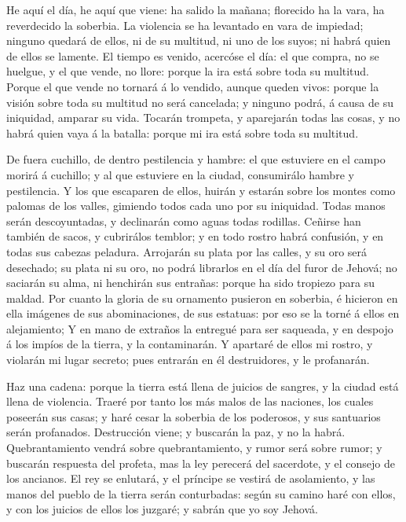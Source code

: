 He aquí el día, he aquí que viene: ha salido la mañana;
florecido ha la vara, ha reverdecido la soberbia.  La
violencia se ha levantado en vara de impiedad; ninguno quedará de ellos,
ni de su multitud, ni uno de los suyos; ni habrá quien de ellos se
lamente.  El tiempo es venido, acercóse el día: el que
compra, no se huelgue, y el que vende, no llore: porque la ira está
sobre toda su multitud.  Porque el que vende no tornará á
lo vendido, aunque queden vivos: porque la visión sobre toda su multitud
no será cancelada; y ninguno podrá, á causa de su iniquidad, amparar su
vida.  Tocarán trompeta, y aparejarán todas las cosas, y
no habrá quien vaya á la batalla: porque mi ira está sobre toda su
multitud.

 De fuera cuchillo, de dentro pestilencia y hambre: el
que estuviere en el campo morirá á cuchillo; y al que estuviere en la
ciudad, consumirálo hambre y pestilencia.  Y los que
escaparen de ellos, huirán y estarán sobre los montes como palomas de
los valles, gimiendo todos cada uno por su iniquidad. 
Todas manos serán descoyuntadas, y declinarán como aguas todas rodillas.
 Ceñirse han también de sacos, y cubrirálos temblor; y en
todo rostro habrá confusión, y en todas sus cabezas peladura.
 Arrojarán su plata por las calles, y su oro será
desechado; su plata ni su oro, no podrá librarlos en el día del furor de
Jehová; no saciarán su alma, ni henchirán sus entrañas: porque ha sido
tropiezo para su maldad.  Por cuanto la gloria de su
ornamento pusieron en soberbia, é hicieron en ella imágenes de sus
abominaciones, de sus estatuas: por eso se la torné á ellos en
alejamiento;  Y en mano de extraños la entregué para ser
saqueada, y en despojo á los impíos de la tierra, y la contaminarán.
 Y apartaré de ellos mi rostro, y violarán mi lugar
secreto; pues entrarán en él destruidores, y le profanarán.

 Haz una cadena: porque la tierra está llena de juicios
de sangres, y la ciudad está llena de violencia.  Traeré
por tanto los más malos de las naciones, los cuales poseerán sus casas;
y haré cesar la soberbia de los poderosos, y sus santuarios serán
profanados.  Destrucción viene; y buscarán la paz, y no
la habrá.  Quebrantamiento vendrá sobre quebrantamiento,
y rumor será sobre rumor; y buscarán respuesta del profeta, mas la ley
perecerá del sacerdote, y el consejo de los ancianos.  El
rey se enlutará, y el príncipe se vestirá de asolamiento, y las manos
del pueblo de la tierra serán conturbadas: según su camino haré con
ellos, y con los juicios de ellos los juzgaré; y sabrán que yo soy
Jehová.

